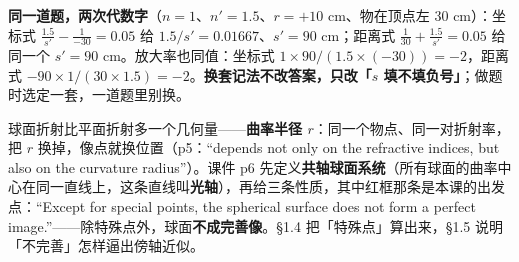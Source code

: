 \documentclass[11pt]{ctexart}
\begin{document}
\textbf{同一道题，两次代数字}（$n=1$、$n'=1.5$、$r=+10$ cm、物在顶点左 30 cm）：坐标式 $\frac{1.5}{s'}-\frac{1}{-30}=0.05$ 给 $1.5/s'=0.01667$、$s'=90$ cm；距离式 $\frac{1}{30}+\frac{1.5}{s'}=0.05$ 给同一个 $s'=90$ cm。放大率也同值：坐标式 $1\times90/(1.5\times(-30))=-2$，距离式 $-90\times1/(30\times1.5)=-2$。\textbf{换套记法不改答案，只改「$s$ 填不填负号」}；做题时选定一套，一道题里别换。



球面折射比平面折射多一个几何量——\textbf{曲率半径 $r$}：同一个物点、同一对折射率，把 $r$ 换掉，像点就换位置（p5：``depends not only on the refractive indices, but also on the curvature radius''）。课件 p6 先定义\textbf{共轴球面系统}（所有球面的曲率中心在同一直线上，这条直线叫\textbf{光轴}），再给三条性质，其中红框那条是本课的出发点：``Except for special points, the spherical surface does not form a perfect image.''——除特殊点外，球面\textbf{不成完善像}。§1.4 把「特殊点」算出来，§1.5 说明「不完善」怎样逼出傍轴近似。
\end{document}
